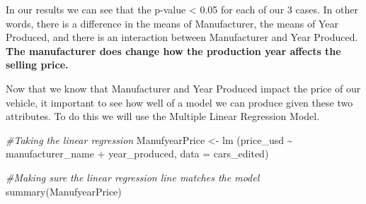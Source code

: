 \documentclass[
]{article}
\newenvironment{Shaded}{\begin{snugshade}}{\end{snugshade}}
\newcommand{\AttributeTok}[1]{\textcolor[rgb]{0.77,0.63,0.00}{#1}}
\newcommand{\CommentTok}[1]{\textcolor[rgb]{0.56,0.35,0.01}{\textit{#1}}}
\newcommand{\FunctionTok}[1]{\textcolor[rgb]{0.00,0.00,0.00}{#1}}
\newcommand{\NormalTok}[1]{#1}
\newcommand{\OtherTok}[1]{\textcolor[rgb]{0.56,0.35,0.01}{#1}}
\newcommand{\SpecialCharTok}[1]{\textcolor[rgb]{0.00,0.00,0.00}{#1}}
\begin{document}
In our results we can see that the p-value \textless{} 0.05 for each of
our 3 cases. In other words, there is a difference in the means of
Manufacturer, the means of Year Produced, and there is an interaction
between Manufacturer and Year Produced. \textbf{The manufacturer does
change how the production year affects the selling price.}

Now that we know that Manufacturer and Year Produced impact the price of
our vehicle, it important to see how well of a model we can produce
given these two attributes. To do this we will use the Multiple Linear
Regression Model.

\begin{Shaded}
\begin{Highlighting}[]
\CommentTok{\#Taking the linear regression}
\NormalTok{ManufyearPrice }\OtherTok{\textless{}{-}} \FunctionTok{lm}\NormalTok{ (price\_usd }\SpecialCharTok{\textasciitilde{}}\NormalTok{ manufacturer\_name }\SpecialCharTok{+}\NormalTok{ year\_produced, }\AttributeTok{data =}\NormalTok{ cars\_edited)}

\CommentTok{\#Making sure the linear regression line matches the model}
\FunctionTok{summary}\NormalTok{(ManufyearPrice)}
\end{Highlighting}
\end{Shaded}
\end{document}
